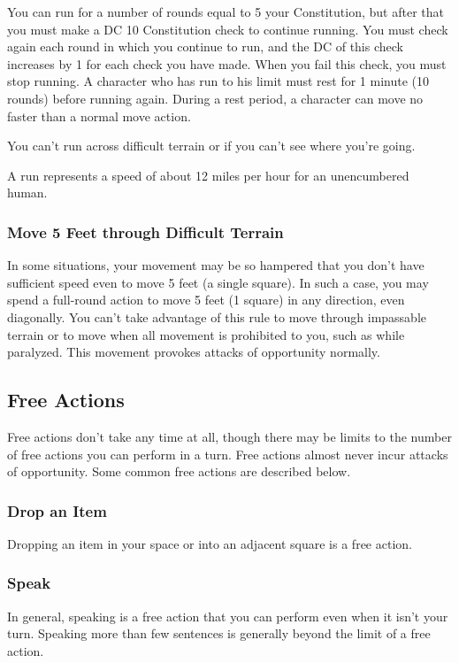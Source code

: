 You can run for a number of rounds equal to 5 \add your Constitution, but after that you must make a DC 10 Constitution check to continue running. You must check again each round in which you continue to run, and the DC of this check increases by 1 for each check you have made. When you fail this check, you must stop running. A character who has run to his limit must rest for 1 minute (10 rounds) before running again. During a rest period, a character can move no faster than a normal move action.

You can't run across difficult terrain or if you can't see where you're going.

A run represents a speed of about 12 miles per hour for an unencumbered human.

\subsubsection{Move 5 Feet through Difficult Terrain}
In some situations, your movement may be so hampered that you don't have sufficient speed even to move 5 feet (a single square). In such a case, you may spend a full-round action to move 5 feet (1 square) in any direction, even diagonally. You can't take advantage of this rule to move through impassable terrain or to move when all movement is prohibited to you, such as while paralyzed. This movement provokes attacks of opportunity normally.

\subsection{Free Actions}
Free actions don't take any time at all, though there may be limits to the number of free actions you can perform in a turn. Free actions almost never incur attacks of opportunity. Some common free actions are described below.

\subsubsection{Drop an Item}
Dropping an item in your space or into an adjacent square is a free action.

\subsubsection{Speak}
In general, speaking is a free action that you can perform even when it isn't your turn. Speaking more than few sentences is generally beyond the limit of a free action.

